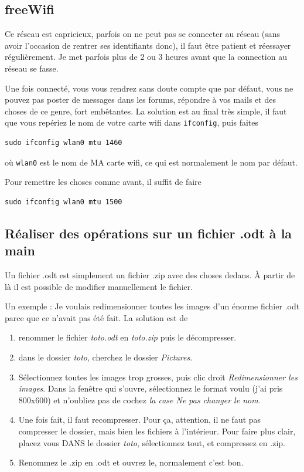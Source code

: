 \documentclass[a4paper,twoside]{article}
\begin{document}
\subsection{freeWifi}
Ce réseau est capricieux, parfois on ne peut pas se connecter au réseau (sans avoir l'occasion de rentrer ses identifiants donc), il faut être patient et réessayer régulièrement. Je met parfois plus de 2 ou 3 heures avant que la connection au réseau se fasse.

Une fois connecté, vous vous rendrez sans doute compte que par défaut, vous ne pouvez pas poster de messages dans les forums, répondre à vos mails et des choses de ce genre, fort embêtantes. La solution est au final très simple, il faut que vous repériez le nom de votre carte wifi dans \verb|ifconfig|, puis faites
\begin{verbatim}
sudo ifconfig wlan0 mtu 1460
\end{verbatim}
où \texttt{wlan0} est le nom de MA carte wifi, ce qui est normalement le nom par défaut.

\bigskip

Pour remettre les choses comme avant, il suffit de faire
\begin{verbatim}
sudo ifconfig wlan0 mtu 1500
\end{verbatim}

\subsection{Réaliser des opérations sur un fichier .odt à la main}
Un fichier .odt est simplement un fichier .zip avec des choses dedans. À partir de là il est possible de modifier manuellement le fichier. 

Un exemple : Je voulais redimensionner toutes les images d'un énorme fichier .odt parce que ce n'avait pas été fait. La solution est de 
\begin{enumerate}
\item renommer le fichier \textit{toto.odt} en \textit{toto.zip} puis le décompresser.
\item dans le dossier \textit{toto}, cherchez le dossier \textit{Pictures}. 
\item Sélectionnez toutes les images trop grosses, puis clic droit \textit{Redimensionner les images}. Dans la fenêtre qui s'ouvre, sélectionnez le format voulu (j'ai pris 800x600) et n'oubliez pas de cochez \textit{la case Ne pas changer le nom}.
\item Une fois fait, il faut recompresser. Pour ça, attention, il ne faut pas compresser le dossier, mais bien les fichiers à l'intérieur. Pour faire plus clair, placez vous DANS le dossier \textit{toto}, sélectionnez tout, et compressez en .zip. 
\item Renommez le .zip en .odt et ouvrez le, normalement c'est bon.
\end{enumerate}
\end{document}
